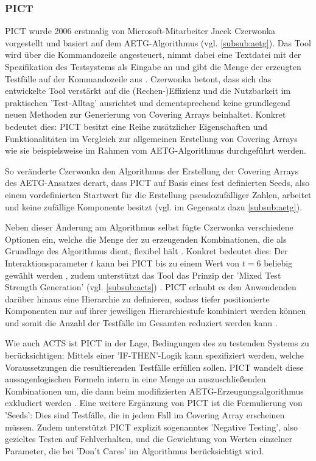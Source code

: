 \subsubsection{PICT}\label{subsub:pict}
PICT \cite{czerwonka2006pairwise, pict} wurde 2006 erstmalig von Microsoft-Mitarbeiter Jacek Czerwonka vorgestellt und basiert auf dem AETG-Algorithmus (vgl. \autoref{subsub:aetg}). Das Tool wird über die Kommandozeile angesteuert, nimmt dabei eine Textdatei mit der Spezifikation des Testsystems als Eingabe an und gibt die Menge der erzeugten Testfälle auf der Kommandozeile aus \cite{pict}. Czerwonka \cite{czerwonka2006pairwise} betont, dass sich das entwickelte Tool verstärkt auf die (Rechen-)Effizienz und die Nutzbarkeit im praktischen 'Test-Alltag' ausrichtet und dementsprechend keine grundlegend neuen Methoden zur Generierung von Covering Arrays beinhaltet. Konkret bedeutet dies: PICT besitzt eine Reihe zusätzlicher Eigenschaften und Funktionalitäten im Vergleich zur allgemeinen Erstellung von Covering Arrays wie sie beispielsweise im Rahmen vom AETG-Algorithmus durchgeführt werden.

So veränderte Czerwonka den Algorithmus der Erstellung der Covering Arrays des AETG-Ansatzes derart, dass PICT auf Basis eines fest definierten Seeds, also einem vordefinierten Startwert für die Erstellung pseudozufälliger Zahlen, arbeitet und keine zufällige Komponente besitzt (vgl. im Gegensatz dazu \autoref{subsub:aetg}). 

Neben dieser Änderung am Algorithmus selbst fügte Czerwonka verschiedene Optionen ein, welche die Menge der zu erzeugenden Kombinationen, die als Grundlage des Algorithmus dient, flexibel hält \cite{czerwonka2006pairwise}. Konkret bedeutet dies: Der Interaktionsparameter $t$ kann bei PICT bis zu einem Wert von $t = 6$ beliebig gewählt werden \cite{khalsa2014orchestrated}, zudem unterstützt das Tool das Prinzip der 'Mixed Test Strength Generation' (vgl. \autoref{subsub:acts}) \cite{czerwonka2006pairwise}. PICT erlaubt es den Anwendenden darüber hinaus eine Hierarchie zu definieren, sodass tiefer positionierte Komponenten nur auf ihrer jeweiligen Hierarchiestufe kombiniert werden können und somit die Anzahl der Testfälle im Gesamten reduziert werden kann \cite{czerwonka2006pairwise}. 

Wie auch ACTS ist PICT in der Lage, Bedingungen des zu testenden Systems zu berücksichtigen: Mittels einer 'IF-THEN'-Logik kann spezifiziert werden, welche Voraussetzungen die resultierenden Testfälle erfüllen sollen. PICT wandelt diese aussagenlogischen Formeln intern in eine Menge an auszuschließenden Kombinationen um, die dann beim modifizierten AETG-Erzeugungsalgorithmus exkludiert werden \cite{czerwonka2006pairwise}. Eine weitere Ergänzung von PICT ist die Formulierung von 'Seeds': Dies sind Testfälle, die in jedem Fall im Covering Array erscheinen müssen. Zudem unterstützt PICT explizit sogenanntes 'Negative Testing', also gezieltes Testen auf Fehlverhalten, und die Gewichtung von Werten einzelner Parameter, die bei 'Don't Cares' im Algorithmus berücksichtigt wird.


